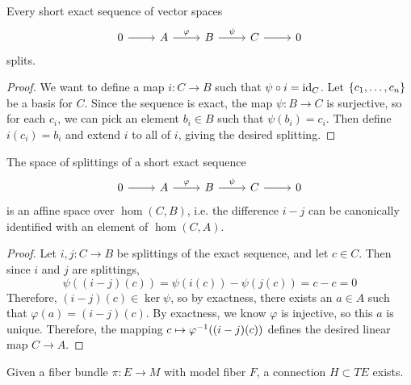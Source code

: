 %
\begin{lem}
Every short exact sequence of vector spaces
\[\begin{tikzcd}
0 \ar[r] & A \ar[r, "\varphi"] & B \ar[r, "\psi"] & C \ar[r] & 0
\end{tikzcd}\]
splits.
\end{lem}
%
\begin{proof}
We want to define a map $i : C \to B$ such that $\psi \circ i = \operatorname{id}_C$. Let
$\left\lbrace c_1, \ldots, c_n \right\rbrace$ be a basis for $C$. Since the sequence is exact,
the map $\psi : B \to C$ is surjective, so for each $c_i$, we can pick an element
$b_i \in B$ such that $\psi(b_i) = c_i$. Then define $i(c_i) = b_i$ and
extend $i$ to all of $i$, giving the desired splitting.
\end{proof}
%
\begin{lem}
The space of splittings of a short exact sequence
\[\begin{tikzcd}
0 \ar[r] & A \ar[r, "\varphi"] & B \ar[r, "\psi"] & C \ar[r] & 0
\end{tikzcd}\]
is an affine space over $\hom(C,B)$,
i.e. the difference $i - j$ can be canonically identified with an element of
$\hom(C,A)$.
\end{lem}
%
\begin{proof} %
Let $i,j : C \to B$ be splittings of the exact sequence, and let
$c \in C$. Then since $i$ and $j$ are splittings,
\[
\psi((i-j)(c)) = \psi(i(c)) - \psi(j(c)) = c - c = 0
\]
Therefore, $(i-j)(c) \in \ker\psi$, so by exactness, there exists an $a \in A$
such that $\varphi(a) = (i-j)(c)$. By exactness, we know $\varphi$ is injective,
so this $a$ is unique. Therefore, the mapping $c \mapsto \varphi^{-1}((i-j)(c))$
defines the desired linear map $C \to A$.
\end{proof}
%
\begin{prop}
Given a fiber bundle $\pi : E \to M$ with model fiber $F$, a connection
$H \subset TE$ exists.
\end{prop}
%
